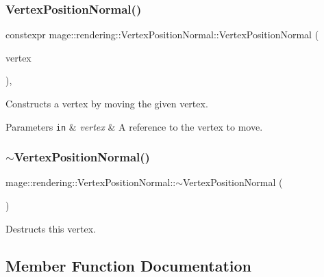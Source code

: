 \subsubsection{\texorpdfstring{Vertex\+Position\+Normal()}{VertexPositionNormal()}\hspace{0.1cm}{\footnotesize\ttfamily [4/4]}}
{\footnotesize\ttfamily constexpr mage\+::rendering\+::\+Vertex\+Position\+Normal\+::\+Vertex\+Position\+Normal (\begin{DoxyParamCaption}\item[{\hyperlink{structmage_1_1rendering_1_1_vertex_position_normal}{Vertex\+Position\+Normal} \&\&}]{vertex }\end{DoxyParamCaption})\hspace{0.3cm}{\ttfamily [default]}, {\ttfamily [noexcept]}}

Constructs a vertex by moving the given vertex.


\begin{DoxyParams}[1]{Parameters}
\mbox{\tt in}  & {\em vertex} & A reference to the vertex to move. \\
\hline
\end{DoxyParams}
\hypertarget{structmage_1_1rendering_1_1_vertex_position_normal_ac5abfb1132d54581b006cd098f533811}{}\label{structmage_1_1rendering_1_1_vertex_position_normal_ac5abfb1132d54581b006cd098f533811} 
\subsubsection{\texorpdfstring{$\sim$\+Vertex\+Position\+Normal()}{~VertexPositionNormal()}}
{\footnotesize\ttfamily mage\+::rendering\+::\+Vertex\+Position\+Normal\+::$\sim$\+Vertex\+Position\+Normal (\begin{DoxyParamCaption}{ }\end{DoxyParamCaption})\hspace{0.3cm}{\ttfamily [default]}}

Destructs this vertex. 

\subsection{Member Function Documentation}
\hypertarget{structmage_1_1rendering_1_1_vertex_position_normal_aead42377c86418475bb7b4c93398cd34}{}\label{structmage_1_1rendering_1_1_vertex_position_normal_aead42377c86418475bb7b4c93398cd34} 
